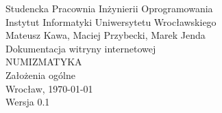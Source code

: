 \documentclass[11pt,a4paper,leqno]{article}			%
\begin{document}
\begin{center}
\thispagestyle{empty} 					%
{\Large Studencka Pracownia Inżynierii Oprogramowania}\\[0.5cm]
{\large Instytut Informatyki Uniwersytetu Wrocławskiego}\\[6.0cm]


{\large Mateusz Kawa, Maciej Przybecki, Marek Jenda}\\[1.5cm]
{\huge Dokumentacja witryny internetowej }\\[0.5cm]
{\huge NUMIZMATYKA }\\[1.5cm]
{\large Założenia ogólne}\\[0.5cm]
\vfill
{\large Wrocław, \today}\\[0.5cm]
{\large Wersja 0.1}
\end{center}
\end{document}
